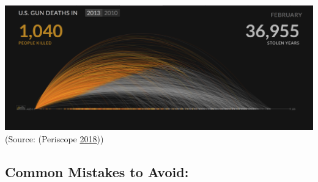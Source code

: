 \documentclass[]{book}
\theoremstyle{definition}
\theoremstyle{definition}
\theoremstyle{definition}
\theoremstyle{remark}
\begin{document}
\includegraphics{images/Tufte_figure12.png} (Source: (Periscope
\protect\hyperlink{ref-narratives_2017}{2018}))

\subsection{Common Mistakes to Avoid:}\label{common-mistakes-to-avoid}
\end{document}
